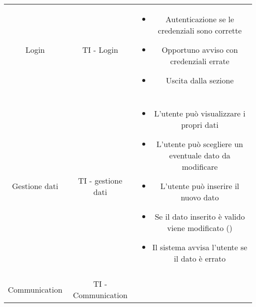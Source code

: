 {{\begin{table}[h!]
\begin{center}
\begin{minipage}{1\linewidth}
\begin{tabular}{c c c}
							Login
							&
							TI - Login	
							& 
							\begin{minipage}{0.70\linewidth}
							\begin{itemize}
								\item Autenticazione se le credenziali sono corrette
								\item Opportuno avviso con credenziali errate
								\item Uscita dalla sezione
							\end{itemize}
							\end{minipage}	
							\\
							\\
							\midrule
							Gestione dati
							&
							TI - gestione dati	
							& 
							\begin{minipage}{0.70\linewidth}
								\begin{itemize}
								      \item L’utente può visualizzare i propri dati
								      \item L’utente può scegliere un eventuale dato da modificare
								      \item L’utente può inserire il nuovo dato 
								      \item Se il dato inserito è valido viene modificato (\textit{\AnalisiDeiRequisiti})
								      \item Il sistema avvisa l’utente se il dato è errato
								\end{itemize}
							\end{minipage}	
							\\
							\\
							\midrule

							Communication
							
							&
							
							TI - Communication
								
							& 
							

\end{tabular}
\end{minipage}
\end{center}
\end{table}}}
